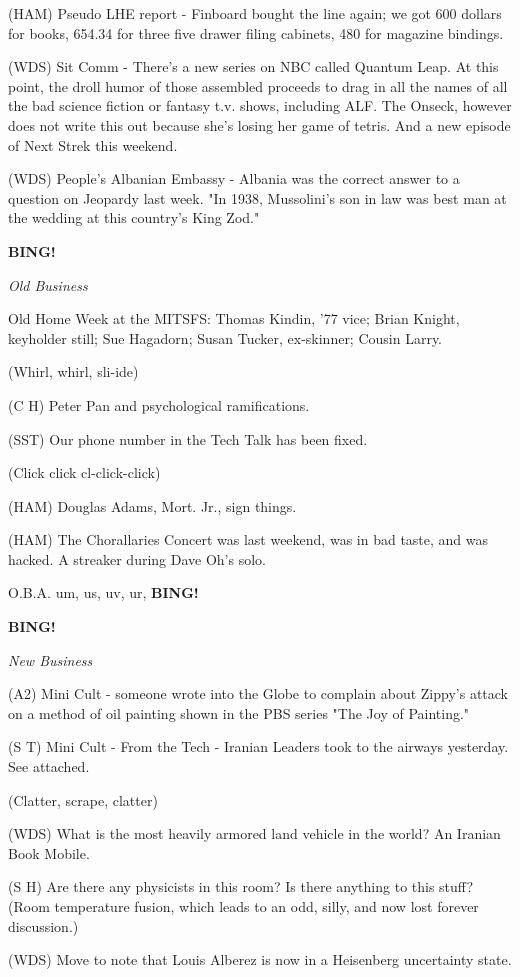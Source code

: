 \documentclass[12pt]{article}
\newcommand{\bing}{{\bf BING!} }
\newcommand{\goto}[1]{\bing \vskip 12pt \centerline{{\em{#1}}}}
\begin{document}
(HAM) Pseudo LHE report - Finboard bought the line again; we got 600 dollars for books, 654.34 for three five drawer filing cabinets, 480 for magazine bindings.

(WDS) Sit Comm - There's a new series on NBC called Quantum Leap. At this point, the droll humor of those assembled proceeds to drag in all the names of all the bad science fiction or fantasy t.v. shows, including ALF. The Onseck, however does not write this out because she's losing her game of tetris.  And a new episode of Next Strek this weekend.

(WDS) People's Albanian Embassy - Albania was the correct answer to a question on Jeopardy last week.  "In 1938, Mussolini's son in law was best man at the wedding at this country's King Zod."

\goto{Old Business}

Old Home Week at the MITSFS: Thomas Kindin, '77 vice; Brian Knight, keyholder still; Sue Hagadorn; Susan Tucker, ex-skinner; Cousin Larry.

(Whirl, whirl, sli-ide)

(C H) Peter Pan and psychological ramifications.

(SST) Our phone number in the Tech Talk has been fixed.

(Click click cl-click-click)

(HAM) Douglas Adams, Mort. Jr., sign things.

(HAM) The Chorallaries Concert was last weekend, was in bad taste, and was hacked. A streaker during Dave Oh's solo.

O.B.A. um, us, uv, ur, \bing

\goto{New Business}

(A2) Mini Cult - someone wrote into the Globe to complain about Zippy's attack on a method of oil painting shown in the PBS series "The Joy of Painting."

(S T) Mini Cult - From the Tech - Iranian Leaders took to the airways yesterday. See attached.

(Clatter, scrape, clatter)

(WDS) What is the most heavily armored land vehicle in the world?  An Iranian Book Mobile.

(S H) Are there any physicists in this room? Is there anything to this stuff? (Room temperature fusion, which leads to an odd, silly, and now lost forever discussion.)

(WDS) Move to note that Louis Alberez is now in a Heisenberg uncertainty state.
\end{document}
